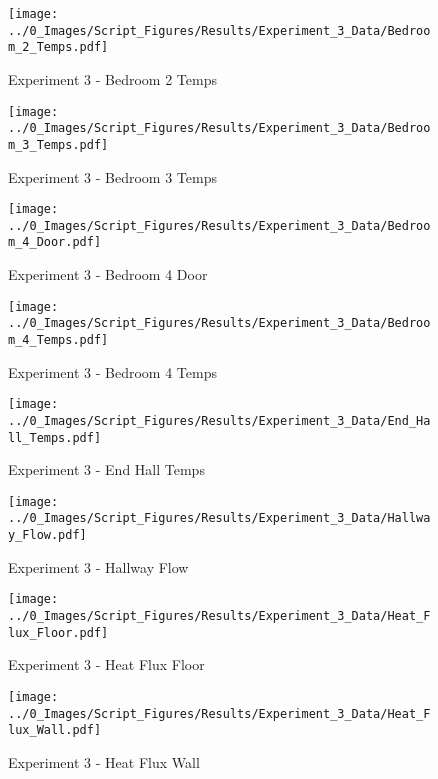 	\clearpage

	\begin{figure}[H]
		\centering
		\texttt{[image: ../0\_Images/Script\_Figures/Results/Experiment\_3\_Data/Bedroom\_2\_Temps.pdf]}
		\caption[]{Experiment 3 - Bedroom 2 Temps}
	\end{figure}
 

	\begin{figure}[H]
		\centering
		\texttt{[image: ../0\_Images/Script\_Figures/Results/Experiment\_3\_Data/Bedroom\_3\_Temps.pdf]}
		\caption[]{Experiment 3 - Bedroom 3 Temps}
	\end{figure}
 
	\clearpage

	\begin{figure}[H]
		\centering
		\texttt{[image: ../0\_Images/Script\_Figures/Results/Experiment\_3\_Data/Bedroom\_4\_Door.pdf]}
		\caption[]{Experiment 3 - Bedroom 4 Door}
	\end{figure}
 

	\begin{figure}[H]
		\centering
		\texttt{[image: ../0\_Images/Script\_Figures/Results/Experiment\_3\_Data/Bedroom\_4\_Temps.pdf]}
		\caption[]{Experiment 3 - Bedroom 4 Temps}
	\end{figure}
 
	\clearpage

	\begin{figure}[H]
		\centering
		\texttt{[image: ../0\_Images/Script\_Figures/Results/Experiment\_3\_Data/End\_Hall\_Temps.pdf]}
		\caption[]{Experiment 3 - End Hall Temps}
	\end{figure}
 

	\begin{figure}[H]
		\centering
		\texttt{[image: ../0\_Images/Script\_Figures/Results/Experiment\_3\_Data/Hallway\_Flow.pdf]}
		\caption[]{Experiment 3 - Hallway Flow}
	\end{figure}
 
	\clearpage

	\begin{figure}[H]
		\centering
		\texttt{[image: ../0\_Images/Script\_Figures/Results/Experiment\_3\_Data/Heat\_Flux\_Floor.pdf]}
		\caption[]{Experiment 3 - Heat Flux Floor}
	\end{figure}
 

	\begin{figure}[H]
		\centering
		\texttt{[image: ../0\_Images/Script\_Figures/Results/Experiment\_3\_Data/Heat\_Flux\_Wall.pdf]}
		\caption[]{Experiment 3 - Heat Flux Wall}
	\end{figure}
 
